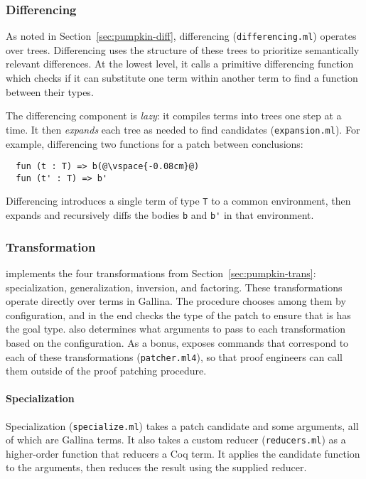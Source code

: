 \subsubsection{Differencing} 
\label{sec:pumpkin-impl-diff}

As noted in Section~\ref{sec:pumpkin-diff}, differencing (\lstinline{differencing.ml}) operates over trees.
Differencing uses the structure of these trees to prioritize semantically relevant differences.
At the lowest level, it calls a primitive differencing function which checks if it can substitute one term within another term to find a function between their types.

The differencing component is \textit{lazy}: it compiles terms into trees one step at a time.
It then \emph{expands} each tree as needed to find candidates (\lstinline{expansion.ml}).
For example, differencing two functions for a patch between conclusions:

\begin{lstlisting}
  fun (t : T) => b(@\vspace{-0.08cm}@)
  fun (t' : T) => b'
\end{lstlisting}
Differencing introduces a single term of type \lstinline{T} to a common environment,
then expands and recursively diffs the bodies \lstinline{b} and \lstinline{b'} in that environment.

\subsubsection{Transformation}
\label{sec:pumpkin-impl-trans}

\sysname implements the four transformations from Section~\ref{sec:pumpkin-trans}:
specialization, generalization, inversion, and factoring.
These transformations operate directly over terms in Gallina.
The \sysname procedure chooses among them by configuration,
and in the end checks the type of the patch to ensure that is has the goal type.
\sysname also determines what arguments to pass to each transformation based on the configuration.
As a bonus, \sysname exposes commands that correspond to each of these transformations (\lstinline{patcher.ml4}),
so that proof engineers can call them outside of the proof patching procedure.

\paragraph{Specialization} Specialization (\lstinline{specialize.ml}) takes a patch candidate and some arguments,
all of which are Gallina terms.
It also takes a custom reducer (\lstinline{reducers.ml}) %
as a higher-order function that reducers a Coq term.
It applies the candidate function to the arguments, then reduces the result using the supplied reducer.

